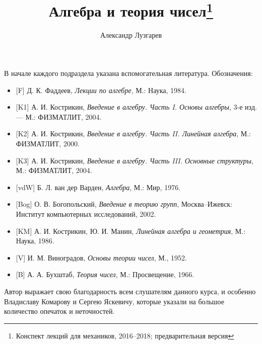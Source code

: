 \documentclass[12pt]{article}
\theoremstyle{plain}
\theoremstyle{remark}
\theoremstyle{definition}
\begin{document}
\title{Алгебра и теория чисел\footnote{Конспект
    лекций для механиков, 2016--2018; предварительная
    версия}}
\author{Александр Лузгарев}
\date{}

\maketitle

\tableofcontents

\vfill

В начале каждого подраздела указана вспомогательная
литература. Обозначения:

\begin{itemize}
\item {}[F] Д. К. Фаддеев, {\it Лекции по алгебре}, М.: Наука, 1984.
\item {}[K1] А. И. Кострикин, {\it Введение в алгебру. Часть I. Основы
    алгебры}, 3-е изд. --- М.: ФИЗМАТЛИТ, 2004.
\item {}[K2] А. И. Кострикин, {\it Введение в алгебру. Часть II. Линейная
    алгебра}, М.: ФИЗМАТЛИТ, 2000.
\item {}[K3] А. И. Кострикин, {\it Введение в алгебру. Часть
    III. Основные структуры}, М.: ФИЗ\-МАТЛИТ, 2004.
\item {}[vdW] Б. Л. ван дер Варден, {\it Алгебра}, М.: Мир, 1976.
\item {}[Bog] О. В. Богопольский, {\it Введение в теорию групп},
  Москва--Ижевск: Институт компьютерных исследований, 2002.
\item {}[KM] А. И. Кострикин, Ю. И. Манин, {\it Линейная алгебра и
    геометрия}, М.: Наука, 1986.
\item {}[V] И. М. Виноградов, {\it Основы теории чисел}, М., 1952.
\item {}[B] А. А. Бухштаб, {\it Теория чисел}, М.: Просвещение, 1966.
\end{itemize}

Автор выражает свою благодарность всем слушателям данного курса, и особенно
Владиславу Комарову и Сергею Яскевичу, которые указали на большое количество
опечаток и неточностей.

\vfill\eject













\clearpage
{}

\end{document}
